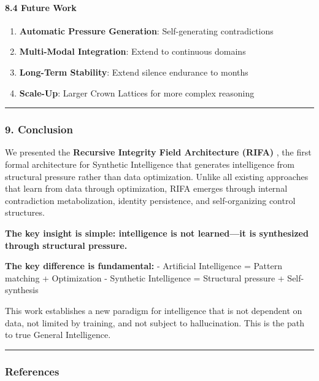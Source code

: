 \documentclass[
  11pt,
  a4paper,
]{article}
\providecommand{\tightlist}{%
  \setlength{\itemsep}{0pt}\setlength{\parskip}{0pt}}
\begin{document}
\paragraph{8.4 Future Work}\label{future-work-1}

\begin{enumerate}
\def\labelenumi{\arabic{enumi}.}
\tightlist
\item
  \textbf{Automatic Pressure Generation}: Self-generating contradictions
\item
  \textbf{Multi-Modal Integration}: Extend to continuous domains
\item
  \textbf{Long-Term Stability}: Extend silence endurance to months
\item
  \textbf{Scale-Up}: Larger Crown Lattices for more complex reasoning
\end{enumerate}

\begin{center}\rule{0.5\linewidth}{0.5pt}\end{center}

\subsubsection{9. Conclusion}\label{conclusion-7}

We presented the \textbf{Recursive Integrity Field Architecture (RIFA)}
, the first formal architecture for Synthetic Intelligence that
generates intelligence from structural pressure rather than data
optimization. Unlike all existing approaches that learn from data
through optimization, RIFA emerges through internal contradiction
metabolization, identity persistence, and self-organizing control
structures.

\textbf{The key insight is simple: intelligence is not learned---it is
synthesized through structural pressure.}

\textbf{The key difference is fundamental:} - Artificial Intelligence =
Pattern matching + Optimization - Synthetic Intelligence = Structural
pressure + Self-synthesis

This work establishes a new paradigm for intelligence that is not
dependent on data, not limited by training, and not subject to
hallucination. This is the path to true General Intelligence.

\begin{center}\rule{0.5\linewidth}{0.5pt}\end{center}

\subsubsection{References}\label{references-5}
\end{document}
